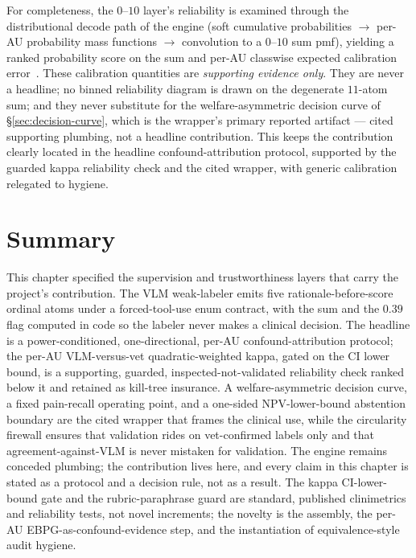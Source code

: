 For completeness, the $0$--$10$ layer's reliability is examined through the
distributional decode path of the engine (soft cumulative probabilities $\to$
per-AU probability mass functions $\to$ convolution to a $0$--$10$ sum pmf),
yielding a ranked probability score on the sum and per-AU classwise expected
calibration error~\cite{guo2017calibration}. These calibration quantities are
\emph{supporting evidence only}. They are never a headline; no binned
reliability diagram is drawn on the degenerate $11$-atom sum; and they never
substitute for the welfare-asymmetric decision curve of
\S\ref{sec:decision-curve}, which is the wrapper's primary reported artifact ---
cited supporting plumbing, not a headline contribution. This
keeps the contribution clearly located in the headline confound-attribution
protocol, supported by the guarded kappa reliability check and the cited
wrapper, with generic calibration relegated to hygiene.

\section{Summary}
\label{sec:ch5-summary}

This chapter specified the supervision and trustworthiness layers that carry the
project's contribution. The VLM weak-labeler emits five rationale-before-score
ordinal atoms under a forced-tool-use enum contract, with the sum and the $0.39$
flag computed in code so the labeler never makes a clinical decision. The
headline is a power-conditioned, one-directional, per-AU confound-attribution
protocol; the per-AU VLM-versus-vet quadratic-weighted kappa, gated on the CI
lower bound, is a supporting, guarded, inspected-not-validated reliability check
ranked below it and retained as kill-tree insurance. A welfare-asymmetric
decision curve, a fixed pain-recall operating point, and a one-sided
NPV-lower-bound abstention boundary are the cited wrapper that frames the
clinical use, while the circularity firewall ensures that validation rides on
vet-confirmed labels only and that agreement-against-VLM is never mistaken for
validation. The engine remains conceded plumbing; the contribution lives here,
and every claim in this chapter is stated as a protocol and a decision rule, not
as a result. The kappa CI-lower-bound gate and the rubric-paraphrase guard are
standard, published clinimetrics and reliability tests, not novel increments;
the novelty is the assembly, the per-AU EBPG-as-confound-evidence step, and the
instantiation of equivalence-style audit hygiene.
